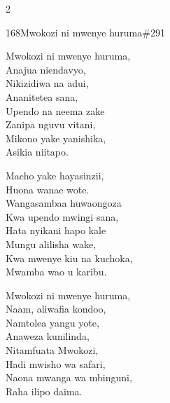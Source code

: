 \documentclass{article}
\begin{document}
\begin{multicols}{2}
\begin{hymn}{168}{Mwokozi ni mwenye huruma}{\#291}
\begin{stanza}
Mwokozi ni mwenye huruma,\\
Anajua niendavyo,\\
Nikizidiwa na adui,\\
Ananitetea sana,\\
Upendo na neema zake\\
Zanipa nguvu vitani,\\
Mikono yake yanishika,\\
Asikia niitapo.
\end{stanza}
\begin{stanza}
Macho yake hayasinzii,\\
Huona wanae wote.\\
Wangasambaa huwaongoza\\
Kwa upendo mwingi sana,\\
Hata nyikani hapo kale\\
Mungu alilisha wake,\\
Kwa mwenye kiu na kuchoka,\\
Mwamba wao u karibu.
\end{stanza}
\begin{stanza}
Mwokozi ni mwenye huruma,\\
Naam, aliwafia kondoo,\\
Namtolea yangu yote,\\
Anaweza kunilinda,\\
Nitamfuata Mwokozi,\\
Hadi mwisho wa safari,\\
Naona mwanga wa mbinguni,\\
Raha ilipo daima.
\end{stanza}
\end{hymn}


\end{multicols}
\end{document}
